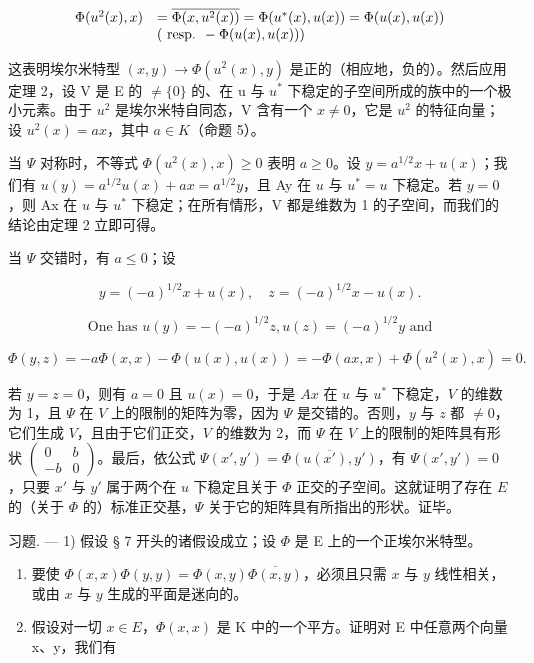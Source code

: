 \[
\begin{array}{r l} \Phi (u ^ {2} (x), x) & = \overline {{\Phi (x , u ^ {2} (x))}} = \Phi (u ^ {*} (x), u (x)) = \Phi (u (x), u (x)) \\ & (\text { resp. } - \Phi (u (x), u (x))) \end{array}
\]

这表明埃尔米特型 \((x, y) \to \Phi(u^{2}(x), y)\) 是正的（相应地，负的）。然后应用定理 2，设 V 是 E 的 \(\neq\{0\}\) 的、在 u 与 \(u^{*}\) 下稳定的子空间所成的族中的一个极小元素。由于 \(u^{2}\) 是埃尔米特自同态，V 含有一个 \(x \neq 0\)，它是 \(u^{2}\) 的特征向量；设 \(u^{2}(x) = ax\)，其中 \(a \in K\)（命题 5）。

当 \(\Psi\) 对称时，不等式 \(\Phi(u^{2}(x), x) \geqslant 0\) 表明 \(a \geqslant 0\)。设 \(y = a^{1/2}x + u(x)\)；我们有 \(u(y) = a^{1/2}u(x) + ax = a^{1/2}y\)，且 Ay 在 \(u\) 与 \(u^{*} = u\) 下稳定。若 \(y = 0\)，则 Ax 在 \(u\) 与 \(u^{*}\) 下稳定；在所有情形，V 都是维数为 1 的子空间，而我们的结论由定理 2 立即可得。

当 \(\Psi\) 交错时，有 \(a \leqslant 0\)；设

\[
y = (- a) ^ {1 / 2} x + u (x), \quad z = (- a) ^ {1 / 2} x - u (x).
\]

\[
\text { One has } u (y) = - (- a) ^ {1 / 2} z, u (z) = (- a) ^ {1 / 2} y \text { and }
\]

\[
\Phi (y, z) = - a \Phi (x, x) - \Phi (u (x), u (x)) = - \Phi (a x, x) + \Phi (u ^ {2} (x), x) = 0.
\]

若 \(y = z = 0\)，则有 \(a = 0\) 且 \(u(x) = 0\)，于是 \(Ax\) 在 \(u\) 与 \(u^{*}\) 下稳定，\(V\) 的维数为 1，且 \(\Psi\) 在 \(V\) 上的限制的矩阵为零，因为 \(\Psi\) 是交错的。否则，\(y\) 与 \(z\) 都 \(\neq 0\)，它们生成 \(V\)，且由于它们正交，\(V\) 的维数为 2，而 \(\Psi\) 在 \(V\) 上的限制的矩阵具有形状 \(\begin{pmatrix} 0 & b \\ -b & 0 \end{pmatrix}\)。最后，依公式 \(\Psi(x', y') = \overline{\Phi(u(x'), y')}\)，有 \(\Psi(x', y') = 0\)，只要 \(x'\) 与 \(y'\) 属于两个在 \(u\) 下稳定且关于 \(\Phi\) 正交的子空间。这就证明了存在 \(E\) 的（关于 \(\Phi\) 的）标准正交基，\(\Psi\) 关于它的矩阵具有所指出的形状。证毕。

习题. --- 1) 假设 § 7 开头的诸假设成立；设 \(\Phi\) 是 E 上的一个正埃尔米特型。

\begin{enumerate}
\def\labelenumi{\alph{enumi})}
\item
  要使 \(\Phi(x,x)\Phi(y,y)=\Phi(x,y)\overline{\Phi(x,y)}\)，必须且只需 \(x\) 与 \(y\) 线性相关，或由 \(x\) 与 \(y\) 生成的平面是迷向的。
\item
  假设对一切 \(x \in E\)，\(\Phi(x, x)\) 是 K 中的一个平方。证明对 E 中任意两个向量 x、y，我们有
\end{enumerate}

